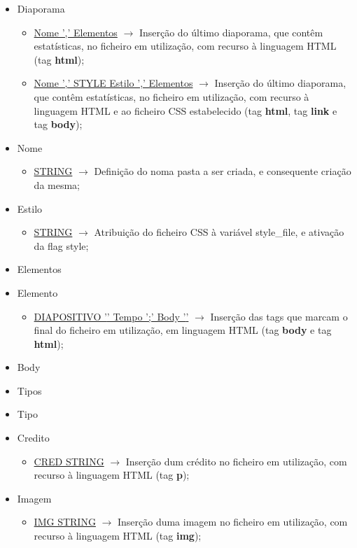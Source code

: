 \documentclass[11pt,a4paper]{report}
\begin{document}
\begin{itemize}
	\item Diaporama
	\begin{itemize}
		\item \underline{Nome ',' Elementos}  $\rightarrow$ Inserção do último diaporama, que contêm estatísticas, no ficheiro em utilização, com recurso à linguagem HTML (tag \textbf{html});
		\item \underline{Nome ',' STYLE Estilo ',' Elementos}  $\rightarrow$ Inserção do último diaporama, que contêm estatísticas, no ficheiro em utilização, com recurso à linguagem HTML e ao ficheiro CSS estabelecido (tag \textbf{html}, tag \textbf{link} e tag \textbf{body});
	\end{itemize}
	\item Nome
	\begin{itemize}
		\item \underline{STRING}  $\rightarrow$ Definição do noma pasta a ser criada, e consequente criação da mesma;
	\end{itemize}
	\item Estilo
	\begin{itemize}
		\item \underline{STRING}  $\rightarrow$ Atribuição do ficheiro CSS à variável style\_file, e ativação da flag style;
	\end{itemize}
	\item Elementos
	\item Elemento
	\begin{itemize}
		\item \underline{DIAPOSITIVO '{' Tempo ';' Body '}'}  $\rightarrow$ Inserção das tags que marcam o final do ficheiro em utilização, em linguagem HTML (tag \textbf{body} e tag \textbf{html});
	\end{itemize}
	\item Body
	\item Tipos
	\item Tipo
	\item Credito
	\begin{itemize}
		\item \underline{CRED STRING} $\rightarrow$ Inserção dum crédito no ficheiro em utilização, com recurso à linguagem HTML (tag \textbf{p});
	\end{itemize}
	\item Imagem
	\begin{itemize}
		\item \underline{IMG STRING}  $\rightarrow$ Inserção duma imagem no ficheiro em utilização, com recurso à linguagem HTML (tag \textbf{img});

\end{itemize}
\end{itemize}
\end{document}
